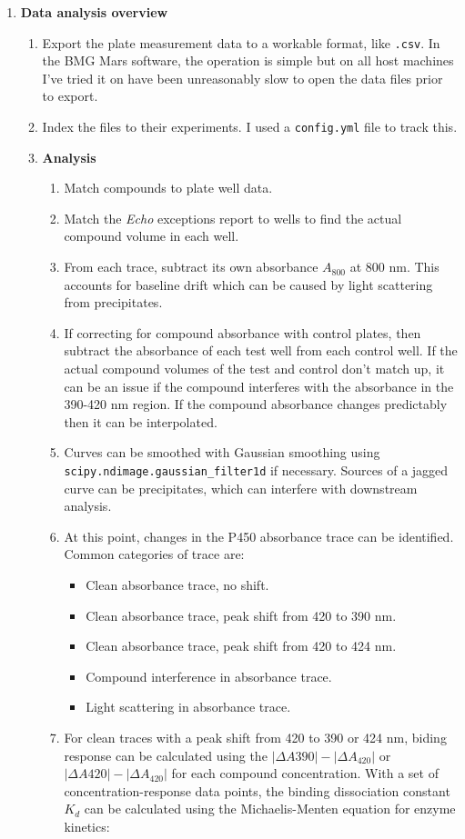 \documentclass{article}
\begin{document}
\begin{enumerate}
\item \textbf{Data analysis overview}
   \begin{enumerate}
	   \item Export the plate measurement data to a workable format, like \texttt{.csv}. 
	   In the BMG Mars software, the operation is simple but on all host machines I've tried it on have been unreasonably slow to open the data files prior to export.
   \item Index the files to their experiments. 
	   I used a \texttt{config.yml} file to track this.
   \item \textbf{Analysis}
		\begin{enumerate}
		\item Match compounds to plate well data.
		\item Match the \textit{Echo} exceptions report to wells to find the actual compound volume in each well.
		\item From each trace, subtract its own absorbance $A_{800}$ at 800 nm.
		   This accounts for baseline drift which can be caused by light scattering from precipitates.
		\item If correcting for compound absorbance with control plates, then subtract the absorbance of each test well from each control well.
		        If the actual compound volumes of the test and control don't match up, it can be an issue if the compound interferes with the absorbance in the 390-420 nm region.
		        If the compound absorbance changes predictably then it can be interpolated.
		\item Curves can be smoothed with Gaussian smoothing using \texttt{scipy.ndimage.gaussian\_filter1d} if necessary.
		        Sources of a jagged curve can be precipitates, which can interfere with downstream analysis.
		\item At this point, changes in the P450 absorbance trace can be identified.
		   Common categories of trace are:
			\begin{itemize}
			   \item Clean absorbance trace, no shift.
			   \item Clean absorbance trace, peak shift from 420 to 390 nm.
			   \item Clean absorbance trace, peak shift from 420 to 424 nm.
			   \item Compound interference in absorbance trace.
			   \item Light scattering in absorbance trace.
			\end{itemize}
		   \item For clean traces with a peak shift from 420 to 390 or 424 nm, biding response can be calculated using the $|\Delta A{390}| - |\Delta A_{420}|$ or $|\Delta A{420}| - |\Delta A_{420}|$  for each compound concentration.
		   With a set of concentration-response data points, the binding dissociation constant $K_d$ can be calculated using the Michaelis-Menten equation for enzyme kinetics:


\end{enumerate}
\end{enumerate}
\end{enumerate}
\end{document}
